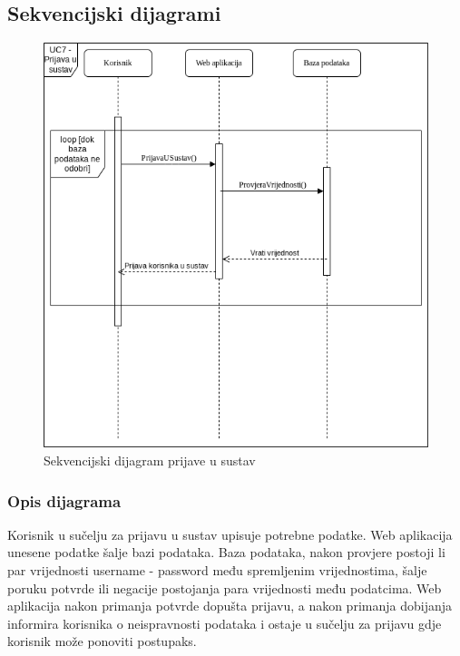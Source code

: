 				\eject		
				
			\subsection{Sekvencijski dijagrami}
					\begin{figure}[H]
						\centering
						\includegraphics[scale=0.5]{dijagrami/sekvencijski-dijagram-prijave-u-sustav.png}
						\caption{Sekvencijski dijagram prijave u sustav}
						\label{fig:sekv-prijava}
					\end{figure}
					\subsubsection{Opis dijagrama}
						Korisnik u sučelju za prijavu u sustav upisuje potrebne podatke. Web aplikacija unesene podatke šalje bazi podataka. Baza podataka, nakon provjere postoji li par vrijednosti username - password među spremljenim vrijednostima, šalje poruku potvrde ili negacije postojanja para vrijednosti među podatcima. Web aplikacija nakon primanja potvrde dopušta prijavu, a nakon primanja dobijanja informira korisnika o neispravnosti podataka i ostaje u sučelju za prijavu gdje korisnik može ponoviti postupaks. 
					

